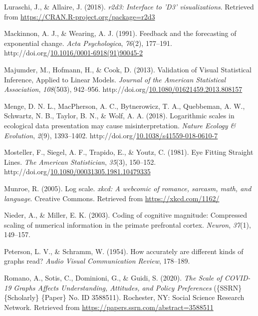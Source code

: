 \documentclass[print]{nuthesis}
\newlength{\cslhangindent}
\newenvironment{CSLReferences}%
{\setlength{\parindent}{0pt}%
\everypar{\setlength{\hangindent}{\cslhangindent}}\ignorespaces}%
{\par}
\begin{document}
\begin{CSLReferences}{1}{0}
\leavevmode\hypertarget{ref-r2d3}{}%
Luraschi, J., \& Allaire, J. (2018). \emph{r2d3: Interface to 'D3' visualizations}. Retrieved from \url{https://CRAN.R-project.org/package=r2d3}

\leavevmode\hypertarget{ref-mackinnon_feedback_1991}{}%
Mackinnon, A. J., \& Wearing, A. J. (1991). Feedback and the forecasting of exponential change. \emph{Acta Psychologica}, \emph{76}(2), 177--191. http://doi.org/\href{https://doi.org/10.1016/0001-6918(91)90045-2}{10.1016/0001-6918(91)90045-2}

\leavevmode\hypertarget{ref-majumder_validation_2013}{}%
Majumder, M., Hofmann, H., \& Cook, D. (2013). Validation of {Visual} {Statistical} {Inference}, {Applied} to {Linear} {Models}. \emph{Journal of the American Statistical Association}, \emph{108}(503), 942--956. http://doi.org/\href{https://doi.org/10.1080/01621459.2013.808157}{10.1080/01621459.2013.808157}

\leavevmode\hypertarget{ref-menge_logarithmic_2018}{}%
Menge, D. N. L., MacPherson, A. C., Bytnerowicz, T. A., Quebbeman, A. W., Schwartz, N. B., Taylor, B. N., \& Wolf, A. A. (2018). Logarithmic scales in ecological data presentation may cause misinterpretation. \emph{Nature Ecology \& Evolution}, \emph{2}(9), 1393--1402. http://doi.org/\href{https://doi.org/10.1038/s41559-018-0610-7}{10.1038/s41559-018-0610-7}

\leavevmode\hypertarget{ref-mosteller_eye_1981}{}%
Mosteller, F., Siegel, A. F., Trapido, E., \& Youtz, C. (1981). Eye {Fitting} {Straight} {Lines}. \emph{The American Statistician}, \emph{35}(3), 150--152. http://doi.org/\href{https://doi.org/10.1080/00031305.1981.10479335}{10.1080/00031305.1981.10479335}

\leavevmode\hypertarget{ref-munroe_2005}{}%
Munroe, R. (2005). Log scale. \emph{xkcd: A webcomic of romance, sarcasm, math, and language}. Creative Commons. Retrieved from \url{https://xkcd.com/1162/}

\leavevmode\hypertarget{ref-nieder2003coding}{}%
Nieder, A., \& Miller, E. K. (2003). Coding of cognitive magnitude: Compressed scaling of numerical information in the primate prefrontal cortex. \emph{Neuron}, \emph{37}(1), 149--157.

\leavevmode\hypertarget{ref-peterson1954accurately}{}%
Peterson, L. V., \& Schramm, W. (1954). How accurately are different kinds of graphs read? \emph{Audio Visual Communication Review}, 178--189.

\leavevmode\hypertarget{ref-romano_scale_2020}{}%
Romano, A., Sotis, C., Dominioni, G., \& Guidi, S. (2020). \emph{The {Scale} of {COVID}-19 {Graphs} {Affects} {Understanding}, {Attitudes}, and {Policy} {Preferences}} (\{SSRN\} \{Scholarly\} \{Paper\} No. ID 3588511). Rochester, NY: Social Science Research Network. Retrieved from \url{https://papers.ssrn.com/abstract=3588511}


\end{CSLReferences}
\end{document}

